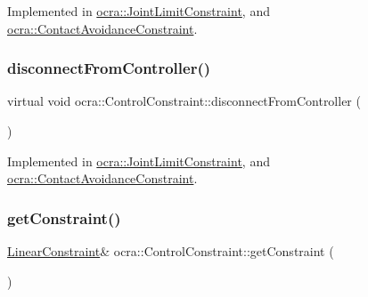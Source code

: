 Implemented in \hyperlink{classocra_1_1JointLimitConstraint_a71cfd04e493f270e44b79fb5a46c1601}{ocra\+::\+Joint\+Limit\+Constraint}, and \hyperlink{classocra_1_1ContactAvoidanceConstraint_a9beada2720203ab46265f271309a2ab5}{ocra\+::\+Contact\+Avoidance\+Constraint}.

\hypertarget{classocra_1_1ControlConstraint_adbd15b36773c775a06a0b7bde46ec799}{}\label{classocra_1_1ControlConstraint_adbd15b36773c775a06a0b7bde46ec799} 
\subsubsection{\texorpdfstring{disconnect\+From\+Controller()}{disconnectFromController()}}
{\footnotesize\ttfamily virtual void ocra\+::\+Control\+Constraint\+::disconnect\+From\+Controller (\begin{DoxyParamCaption}{ }\end{DoxyParamCaption})\hspace{0.3cm}{\ttfamily [pure virtual]}}



Implemented in \hyperlink{classocra_1_1JointLimitConstraint_a5f91d3b746f76f17f71a03b68de1f8ee}{ocra\+::\+Joint\+Limit\+Constraint}, and \hyperlink{classocra_1_1ContactAvoidanceConstraint_a884358568ff7f5510d26ff96915a4d8c}{ocra\+::\+Contact\+Avoidance\+Constraint}.

\hypertarget{classocra_1_1ControlConstraint_a41b7568bc59441ca8d115e7ccf613658}{}\label{classocra_1_1ControlConstraint_a41b7568bc59441ca8d115e7ccf613658} 
\subsubsection{\texorpdfstring{get\+Constraint()}{getConstraint()}}
{\footnotesize\ttfamily \hyperlink{namespaceocra_ae8b87cf4099be3efc3b410019ad2046e}{Linear\+Constraint}\& ocra\+::\+Control\+Constraint\+::get\+Constraint (\begin{DoxyParamCaption}{ }\end{DoxyParamCaption})\hspace{0.3cm}{\ttfamily [inline]}}



